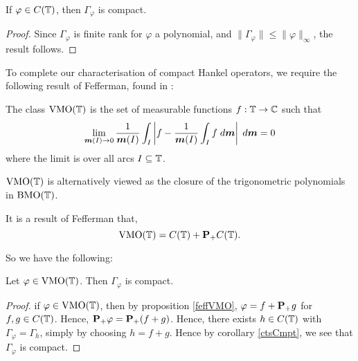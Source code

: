 \begin{corollary}
\label{ctsCmpt}
    If $\varphi \in C(\mathbb{T})$, then $\Gamma_\varphi$ is compact.
\end{corollary}
\begin{proof}
    Since $\Gamma_\varphi$ is finite rank for $\varphi$ a polynomial,
    and $\|\Gamma_\varphi\| \leq \|\varphi\|_\infty$, the result follows.
\end{proof} 

To complete our characterisation of compact Hankel operators, we require
the following result of Fefferman, found in \cite{Garnett}:
\begin{proposition}
\label{feffVMO}
    The class $\operatorname{VMO}(\mathbb{T})$ is the set of measurable functions $f:\mathbb{T}\rightarrow\mathbb{C}$
    such that
    \begin{equation*}
        \lim_{\boldsymbol{m}(I)\rightarrow0} \frac{1}{\boldsymbol{m}(I)}\int_I \left|f-\frac{1}{\boldsymbol{m}(I)}\int_I f\;d\boldsymbol{m}\right|\;d\boldsymbol{m} = 0
    \end{equation*}
    where the limit is over all arcs $I \subseteq \mathbb{T}$. 
    
    $\operatorname{VMO}(\mathbb{T})$ is alternatively viewed as the closure of the trigonometric
    polynomials in $\operatorname{BMO}(\mathbb{T})$.
    
    It is a result of Fefferman \cite{Garnett} that,
    \begin{equation*}
        \operatorname{VMO}(\mathbb{T}) = C(\mathbb{T})+\mathbf{P}_+C(\mathbb{T}).
    \end{equation*}
\end{proposition}

So we have the following:
\begin{proposition}
    Let $\varphi \in \operatorname{VMO}(\mathbb{T})$. Then $\Gamma_\varphi$ is compact.
\end{proposition}
\begin{proof}
    if $\varphi \in \operatorname{VMO}(\mathbb{T})$, then by proposition \ref{feffVMO}, $\varphi = f+\mathbf{P}_+g$ for $f,g \in C(\mathbb{T})$. Hence,
    $\mathbf{P}_+\varphi = \mathbf{P}_+(f+g)$. Hence, there exists $h \in C(\mathbb{T})$
    with $\Gamma_{\varphi} = \Gamma_h$, simply by choosing $h = f+g$. Hence by corollary \ref{ctsCmpt}, we see that $\Gamma_\varphi$
    is compact.
\end{proof}



